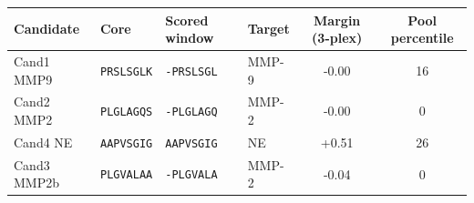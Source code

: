 \begin{tabular}{@{}llllcc@{}}\toprule
Candidate & Core & Scored window & Target & Margin (3-plex) & Pool percentile \\\midrule
Cand1 MMP9 & \texttt{PRSLSGLK} & \texttt{-PRSLSGL} & MMP-9 & -0.00 & 16 \\
Cand2 MMP2 & \texttt{PLGLAGQS} & \texttt{-PLGLAGQ} & MMP-2 & -0.00 & 0 \\
Cand4 NE & \texttt{AAPVSGIG} & \texttt{AAPVSGIG} & NE & +0.51 & 26 \\
Cand3 MMP2b & \texttt{PLGVALAA} & \texttt{-PLGVALA} & MMP-2 & -0.04 & 0 \\
\bottomrule\end{tabular}
